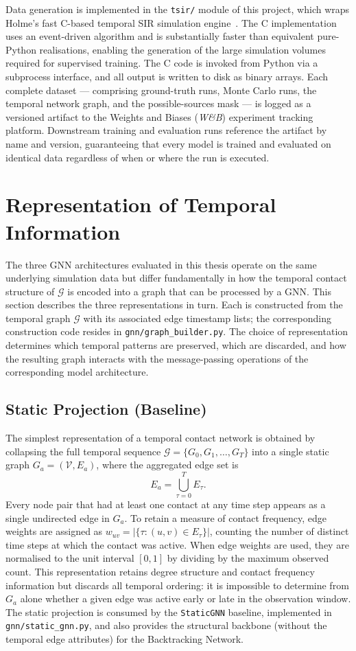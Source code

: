 Data generation is implemented in the \texttt{tsir/} module of this project, which wraps Holme's fast C-based temporal SIR simulation engine~\cite{Holme2020}. The C implementation uses an event-driven algorithm and is substantially faster than equivalent pure-Python realisations, enabling the generation of the large simulation volumes required for supervised training. The C code is invoked from Python via a subprocess interface, and all output is written to disk as binary arrays. Each complete dataset — comprising ground-truth runs, Monte Carlo runs, the temporal network graph, and the possible-sources mask — is logged as a versioned artifact to the Weights and Biases (\textit{W\&B}) experiment tracking platform. Downstream training and evaluation runs reference the artifact by name and version, guaranteeing that every model is trained and evaluated on identical data regardless of when or where the run is executed.

\section{Representation of Temporal Information}
\label{st:representation_temp}
The three GNN architectures evaluated in this thesis operate on the same underlying simulation data but differ fundamentally in how the temporal contact structure of $\mathcal{G}$ is encoded into a graph that can be processed by a GNN. This section describes the three representations in turn. Each is constructed from the temporal graph $\mathcal{G}$ with its associated edge timestamp lists; the corresponding construction code resides in \texttt{gnn/graph\_builder.py}. The choice of representation determines which temporal patterns are preserved, which are discarded, and how the resulting graph interacts with the message-passing operations of the corresponding model architecture.

\subsection{Static Projection (Baseline)}
\label{ssst:staticprojection}
The simplest representation of a temporal contact network is obtained by collapsing the full temporal sequence $\mathcal{G} = \{G_0, G_1, \ldots, G_T\}$ into a single static graph $G_a = (\mathcal{V}, E_a)$, where the aggregated edge set is
\[
    E_a = \bigcup_{\tau=0}^{T} E_\tau.
\]
Every node pair that had at least one contact at any time step appears as a single undirected edge in $G_a$. To retain a measure of contact frequency, edge weights are assigned as $w_{uv} = |\{\tau : (u,v) \in E_\tau\}|$, counting the number of distinct time steps at which the contact was active. When edge weights are used, they are normalised to the unit interval $[0, 1]$ by dividing by the maximum observed count. This representation retains degree structure and contact frequency information but discards all temporal ordering: it is impossible to determine from $G_a$ alone whether a given edge was active early or late in the observation window. The static projection is consumed by the \texttt{StaticGNN} baseline, implemented in \texttt{gnn/static\_gnn.py}, and also provides the structural backbone (without the temporal edge attributes) for the Backtracking Network.

